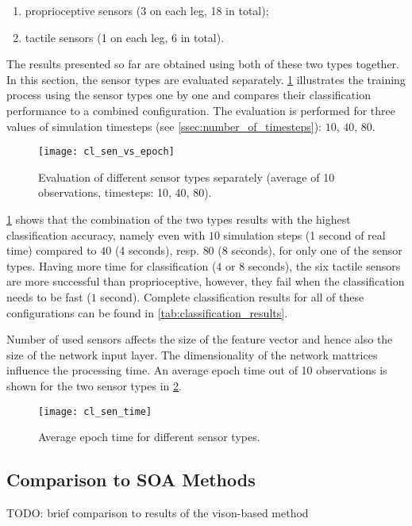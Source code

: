 \begin{enumerate}
\item proprioceptive sensors (3 on each leg, 18 in total);
\item tactile sensors (1 on each leg, 6 in total).
\end{enumerate}

The results presented so far are obtained using both of these two types together. In this section, the sensor types are evaluated separately. \cref{fig:sen_vs_epoch} illustrates the training process using the sensor types one by one and compares their classification performance to a combined configuration. The evaluation is performed for three values of simulation timesteps (see \cref{ssec:number_of_timesteps}): $ 10 $, $ 40 $, $ 80 $.

\begin{figure}[H]
  \centering
  \texttt{[image: cl\_sen\_vs\_epoch]}
  \caption{Evaluation of different sensor types separately (average of 10 observations, timesteps: 10, 40, 80).}
  \label{fig:sen_vs_epoch}
\end{figure}

\cref{fig:sen_vs_epoch} shows that the combination of the two types results with the highest classification accuracy, namely even with $ 10 $ simulation steps (1 second of real time) compared to $ 40 $ (4 seconds), resp. $ 80 $ (8 seconds), for only one of the sensor types. Having more time for classification ($ 4 $ or $ 8 $ seconds), the six tactile sensors are more successful than proprioceptive, however, they fail when the classification needs to be fast ($ 1 $ second). Complete classification results for all of these configurations can be found in \cref{tab:classification_results}.

Number of used sensors affects the size of the feature vector and hence also the size of the network input layer. The dimensionality of the network mattrices influence the processing time. An average epoch time out of 10 observations is shown for the two sensor types in \cref{fig:sen_time}. 

\begin{figure}[H]
  \centering
  \texttt{[image: cl\_sen\_time]}
  \caption{Average epoch time for different sensor types.}
  \label{fig:sen_time}
\end{figure}

\subsection{Comparison to SOA Methods} \label{ssec:terrain_classification_vs_soa}
TODO: brief comparison to results of the vison-based method

